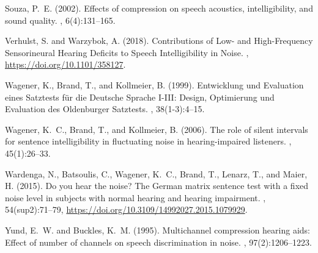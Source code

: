 \documentclass[10pt,a4paper,twocolumn]{article}
\begin{document}
\begin{thebibliography}{}
	Souza, P.~E. (2002).
	\newblock Effects of compression on speech acoustics, intelligibility, and sound quality.
	, 6(4):131--165.

	Verhulst, S. and Warzybok, A. (2018).
	\newblock Contributions of Low- and High-Frequency Sensorineural Hearing Deficits to Speech Intelligibility in Noise.
	, \url{https://doi.org/10.1101/358127}.

    Wagener, K., Brand, T., and Kollmeier, B. (1999).
    \newblock Entwicklung und Evaluation eines Satztests für die Deutsche Sprache I-III: Design, Optimierung und Evaluation des Oldenburger Satztests.
    , 38(1-3):4--15.
  
    Wagener, K.~C., Brand, T., and Kollmeier, B. (2006).
    \newblock The role of silent intervals for sentence intelligibility in fluctuating noise in hearing-impaired listeners.
    , 45(1):26--33.
  
	Wardenga, N., Batsoulis, C., Wagener, K.~C., Brand, T., Lenarz, T., and Maier, H. (2015).
	\newblock Do you hear the noise? The German matrix sentence test with a fixed noise level in subjects with normal hearing and hearing impairment.
	, 54(sup2):71--79, \url{https://doi.org/10.3109/14992027.2015.1079929}.
  
	Yund, E.~W. and Buckles, K.~M. (1995).
	\newblock Multichannel compression hearing aids: Effect of number of channels on speech discrimination in noise.
	,
	97(2):1206--1223.
\end{thebibliography}
\end{document}
